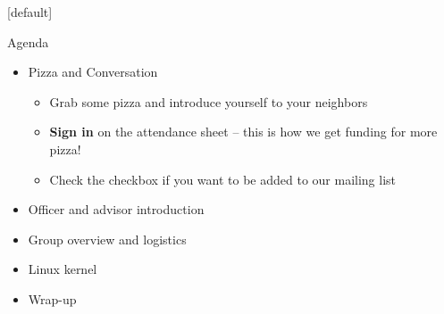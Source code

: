 \documentclass[aspectratio=169, notes]{beamer}
\begin{document}
{
[default]
}

\begin{frame}{Agenda}
	\begin{itemize}
	\item Pizza and Conversation
		\begin{itemize}
		\item Grab some pizza and introduce yourself to your neighbors
		\item \textbf{Sign in} on the attendance sheet -- this is how we get funding for more pizza!
		\item Check the checkbox if you want to be added to our mailing list
		\end{itemize}
	\item Officer and advisor introduction
	\item Group overview and logistics
	\item Linux kernel
	\item Wrap-up
	\end{itemize}
\end{frame}
\end{document}
